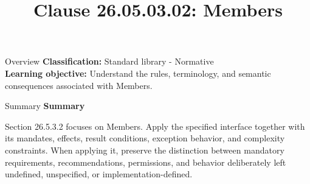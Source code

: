 \documentclass[10pt,letterpaper]{article}
\title{Clause 26.05.03.02: Members}
\author{}
\date{}
\begin{document}
\maketitle
\begin{CornellOverviewBox}{Overview}
\textbf{Classification:} Standard library - Normative\\[2pt]
\textbf{Learning objective:} Understand the rules, terminology, and semantic consequences associated with Members.
\end{CornellOverviewBox}\begin{CornellSummaryBox}{Summary}
{\sffamily\bfseries\color{Accent} Summary}\par\vspace{3pt}Section 26.5.3.2 focuses on Members. Apply the specified interface together with its mandates, effects, result conditions, exception behavior, and complexity constraints. When applying it, preserve the distinction between mandatory requirements, recommendations, permissions, and behavior deliberately left undefined, unspecified, or implementation-defined.
\end{CornellSummaryBox}
\end{document}
